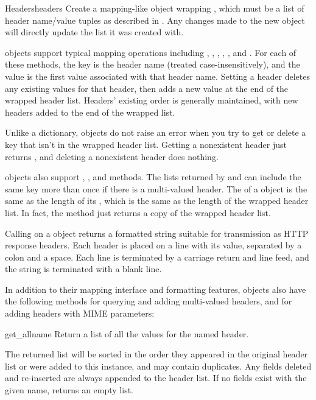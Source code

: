 \begin{classdesc}{Headers}{headers}
Create a mapping-like object wrapping , which must be a
list of header name/value tuples as described in .  Any changes
made to the new  object will directly update the
 list it was created with.

 objects support typical mapping operations including
, , ,
, ,  and
.  For each of these methods, the key is the header name
(treated case-insensitively), and the value is the first value
associated with that header name.  Setting a header deletes any existing
values for that header, then adds a new value at the end of the wrapped
header list.  Headers' existing order is generally maintained, with new
headers added to the end of the wrapped list.

Unlike a dictionary,  objects do not raise an error when
you try to get or delete a key that isn't in the wrapped header list.
Getting a nonexistent header just returns , and deleting
a nonexistent header does nothing.

 objects also support , ,
and  methods.  The lists returned by 
and  can include the same key more than once if there
is a multi-valued header.  The  of a  object
is the same as the length of its , which is the same
as the length of the wrapped header list.  In fact, the 
method just returns a copy of the wrapped header list.

Calling  on a  object returns a formatted
string suitable for transmission as HTTP response headers.  Each header
is placed on a line with its value, separated by a colon and a space.
Each line is terminated by a carriage return and line feed, and the
string is terminated with a blank line.

In addition to their mapping interface and formatting features,
 objects also have the following methods for querying
and adding multi-valued headers, and for adding headers with MIME
parameters:

\begin{methoddesc}{get_all}{name}
Return a list of all the values for the named header.

The returned list will be sorted in the order they appeared in the
original header list or were added to this instance, and may contain
duplicates.  Any fields deleted and re-inserted are always appended to
the header list.  If no fields exist with the given name, returns an
empty list.
\end{methoddesc}



\end{classdesc}
